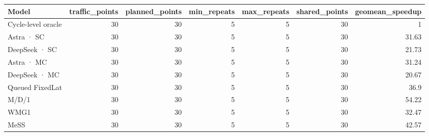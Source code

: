 \begin{tabular}{lrrrrrr}
\toprule
Model & traffic\_points & planned\_points & min\_repeats & max\_repeats & shared\_points & geomean\_speedup \\
\midrule
Cycle-level oracle & 30 & 30 & 5 & 5 & 30 & 1 \\
Astra · SC & 30 & 30 & 5 & 5 & 30 & 31.63 \\
DeepSeek · SC & 30 & 30 & 5 & 5 & 30 & 21.73 \\
Astra · MC & 30 & 30 & 5 & 5 & 30 & 31.24 \\
DeepSeek · MC & 30 & 30 & 5 & 5 & 30 & 20.67 \\
Queued FixedLat & 30 & 30 & 5 & 5 & 30 & 36.9 \\
M/D/1 & 30 & 30 & 5 & 5 & 30 & 54.22 \\
WMG1 & 30 & 30 & 5 & 5 & 30 & 32.47 \\
MeSS & 30 & 30 & 5 & 5 & 30 & 42.57 \\
\bottomrule
\end{tabular}
